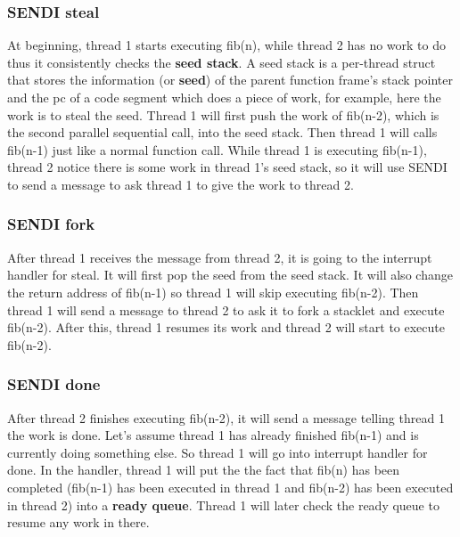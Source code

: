 \subsubsection{SENDI steal}
At beginning, thread 1 starts executing fib(n), while thread 2 has no work to do thus it consistently checks the \textbf{seed stack}. A seed stack is a per-thread struct that stores the information (or \textbf{seed}) of the parent function frame's stack pointer and the pc of a code segment which does a piece of work, for example, here the work is to steal the seed. Thread 1 will first push the work of fib(n-2), which is the second parallel sequential call, into the seed stack. Then thread 1 will calls fib(n-1) just like a normal function call. While thread 1 is executing fib(n-1), thread 2 notice there is some work in thread 1's seed stack, so it will use SENDI to send a message to ask thread 1 to give the work to thread 2.

\subsubsection{SENDI fork}
After thread 1 receives the message from thread 2, it is going to the interrupt handler for steal. It will first pop the seed from the seed stack. It will also change the return address of fib(n-1) so thread 1 will skip executing fib(n-2). Then thread 1 will send a message to thread 2 to ask it to fork a stacklet and execute fib(n-2). After this, thread 1 resumes its work and thread 2 will start to execute fib(n-2).

\subsubsection{SENDI done}
After thread 2 finishes executing fib(n-2), it will send a message telling thread 1 the work is done. Let's assume thread 1 has already finished fib(n-1) and is currently doing something else. So thread 1 will go into interrupt handler for done. In the handler, thread 1 will put the the fact that fib(n) has been completed (fib(n-1) has been executed in thread 1 and fib(n-2) has been executed in thread 2) into a \textbf{ready queue}. Thread 1 will later check the ready queue to resume any work in there.

